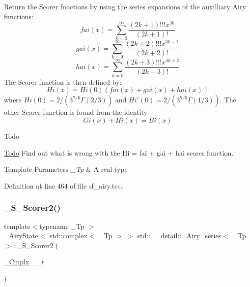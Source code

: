 Return the Scorer functions by using the series expansions of the auxilliary Airy functions\+: \[ fai(x) = \sum_{k=0}^\infty \frac{(2k+1)!!!x^{3k}}{(2k+1)!} \] \[ gai(x) = \sum_{k=0}^\infty \frac{(2k+2)!!!x^{3k+1}}{(2k+2)!} \] \[ hai(x) = \sum_{k=0}^\infty \frac{(2k+3)!!!x^{3k+2}}{(2k+3)!} \] The Scorer function is then defined by\+: \[ Hi(x) = Hi(0)\left(fai(x) + gai(x) + hai(x)\right) \] where $ Hi(0) = 2/(3^{7/6}\Gamma(2/3)) $ and $ Hi'(0) = 2/(3^{5/6}\Gamma(1/3)) $. The other Scorer function is found from the identity \[ Gi(x) + Hi(x) = Bi(x) \]

\begin{DoxyRefDesc}{Todo}
\item[\hyperlink{todo__todo000006}{Todo}]Find out what is wrong with the Hi = fai + gai + hai scorer function.\end{DoxyRefDesc}



\begin{DoxyTemplParams}{Template Parameters}
{\em \+\_\+\+Tp} & A real type \\
\hline
\end{DoxyTemplParams}


Definition at line 464 of file sf\+\_\+airy.\+tcc.

\mbox{\label{classstd_1_1____detail_1_1__Airy__series_a0fb092c153034223a390e259d2f32836}} 
\subsubsection{\texorpdfstring{\+\_\+\+S\+\_\+\+Scorer2()}{\_S\_Scorer2()}}
{\footnotesize\ttfamily template$<$typename \+\_\+\+Tp $>$ \\
\hyperlink{structstd_1_1____detail_1_1__AiryState}{\+\_\+\+Airy\+State}$<$ std\+::complex$<$ \+\_\+\+Tp $>$ $>$ \hyperlink{classstd_1_1____detail_1_1__Airy__series}{std\+::\+\_\+\+\_\+detail\+::\+\_\+\+Airy\+\_\+series}$<$ \+\_\+\+Tp $>$\+::\+\_\+\+S\+\_\+\+Scorer2 (\begin{DoxyParamCaption}\item[{\hyperlink{classstd_1_1____detail_1_1__Airy__series_ab41161caa54609f4735987fbaed41d9d}{\+\_\+\+Cmplx}}]{\+\_\+\+\_\+t }\end{DoxyParamCaption})\hspace{0.3cm}{\ttfamily [static]}}

